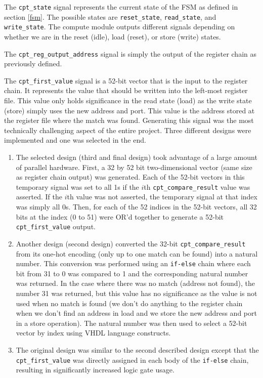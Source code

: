 \documentclass{article}
\begin{document}
The \texttt{cpt\_state} signal represents the current state of the FSM as defined in section \ref{fsm}. The possible states are \texttt{reset\_state}, \texttt{read\_state}, and \texttt{write\_state}. The compute module outputs different signals depending on whether we are in the reset (idle), load (reset), or store (write) states.

The \texttt{cpt\_reg\_output\_address} signal is simply the output of the register chain as previously defined.

The \texttt{cpt\_first\_value} signal is a 52-bit vector that is the input to the register chain. It represents the value that should be written into the left-most register file. This value only holds significance in the read state (load) as the write state (store) simply uses the new address and port. This value is the address stored at the register file where the match was found. Generating this signal was the most technically challenging aspect of the entire project. Three different designs were implemented and one was selected in the end.

\begin{enumerate}
\item
The selected design (third and final design) took advantage of a large amount of parallel hardware. First, a 32 by 52 bit two-dimensional vector (same size as register chain output) was generated. Each of the 52-bit vectors in this temporary signal was set to all 1s if the $i$th \texttt{cpt\_compare\_result} value was asserted. If the $i$th value was not asserted, the temporary signal at that index was simply all 0s. Then, for each of the 52 indices in the 52-bit vectors, all 32 bits at the index (0 to 51) were OR'd together to generate a 52-bit \texttt{cpt\_first\_value} output. 
\item
Another design (second design) converted the 32-bit \texttt{cpt\_compare\_result} from its one-hot encoding (only up to one match can be found) into a natural number. This conversion was performed using an \texttt{if-else} chain where each bit from 31 to 0 was compared to 1 and the corresponding natural number was returned. In the case where there was no match (address not found), the number 31 was returned, but this value has no significance as the value is not used when no match is found (we don't do anything to the register chain when we don't find an address in load and we store the new address and port in a store operation). The natural number was then used to select a 52-bit vector by index using VHDL language constructs. 
\item
The original design was similar to the second described design except that the \texttt{cpt\_first\_value} was directly assigned in each body of the \texttt{if-else} chain, resulting in significantly increased logic gate usage. 
\end{enumerate}
\end{document}
